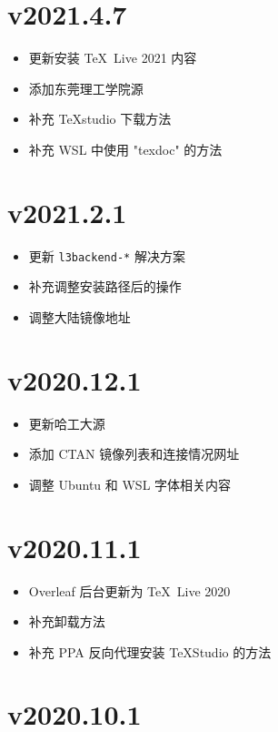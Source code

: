 \section*{v2021.4.7}

\begin{itemize}
  \item 更新安装 \TeX~Live 2021 内容
  \item 添加东莞理工学院源
  \item 补充 \TeX studio 下载方法
  \item 补充 WSL 中使用 "texdoc" 的方法
\end{itemize}

\section*{v2021.2.1}

\begin{itemize}
  \item 更新 \texttt{l3backend-*} 解决方案
  \item 补充调整安装路径后的操作
  \item 调整大陆镜像地址
\end{itemize}
\section*{v2020.12.1}

\begin{itemize}
  \item 更新哈工大源
  \item 添加 CTAN 镜像列表和连接情况网址
  \item 调整 Ubuntu 和 WSL 字体相关内容
\end{itemize}

\section*{v2020.11.1}

\begin{itemize}
  \item Overleaf 后台更新为 \TeX~Live 2020
  \item 补充卸载方法
  \item 补充 PPA 反向代理安装 \TeX Studio 的方法
\end{itemize}

\section*{v2020.10.1}

